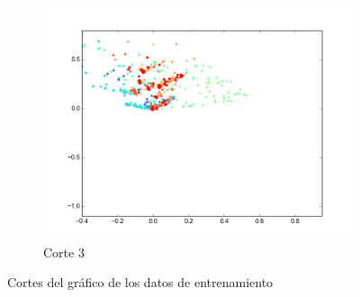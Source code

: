 \begin{figure}[H]
\begin{subfigure}[b]{0.33\textwidth}
                \includegraphics[width=\linewidth]{secciones/graficos/oja/eje3_train.png}
                \caption{Corte 3}
                \label{fig: ej1_oja_eje_3_train}
        \end{subfigure}
        \caption{Cortes del gráfico de los datos de entrenamiento}
        \label{fig: ej1_oja_ejes_train}
\end{figure}

